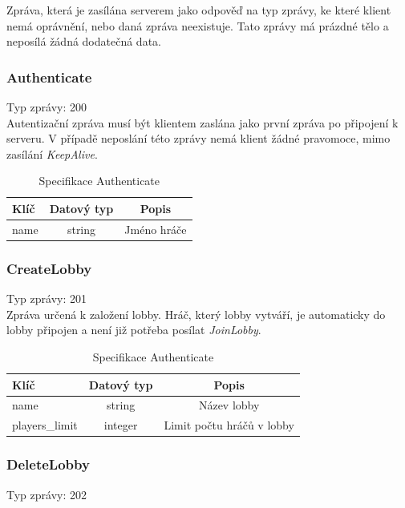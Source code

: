 \documentclass[12pt, a4paper]{article}
\begin{document}
    Zpráva, která je zasílána serverem jako odpověď na typ zprávy, ke které klient nemá oprávnění, nebo daná zpráva neexistuje.
    Tato zprávy má prázdné tělo a neposílá žádná dodatečná data.

    \subsubsection*{Authenticate}
    Typ zprávy: 200\\

    Autentizační zpráva musí být klientem zaslána jako první zpráva po připojení k serveru.
    V případě neposlání této zprávy nemá klient žádné pravomoce, mimo zasílání \textit{KeepAlive}.

    \begin{table}[H]
        \centering
        \begin{tabular}{|l|c|c|}
            \hline
            Klíč & Datový typ & Popis\\
            \hline
            \hline
            name & string & Jméno hráče\\
            \hline
        \end{tabular}
        \caption{Specifikace Authenticate}
    \end{table}

    \subsubsection*{CreateLobby}
    Typ zprávy: 201\\

    Zpráva určená k založení lobby.
    Hráč, který lobby vytváří, je automaticky do lobby připojen a není již potřeba posílat \textit{JoinLobby}.

    \begin{table}[H]
        \centering
        \begin{tabular}{|l|c|c|}
            \hline
            Klíč & Datový typ & Popis\\
            \hline
            \hline
            name & string & Název lobby\\
            \hline
            players\_limit & integer & Limit počtu hráčů v lobby\\
            \hline
        \end{tabular}
        \caption{Specifikace Authenticate}
    \end{table}

    \subsubsection*{DeleteLobby}
    Typ zprávy: 202\\
\end{document}
